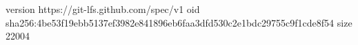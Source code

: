 version https://git-lfs.github.com/spec/v1
oid sha256:4be53f19ebb5137ef3982e841896eb6faa3dfd530c2e1bdc29755c9f1cde8f54
size 22004

